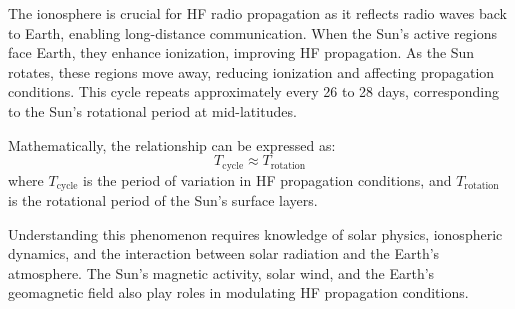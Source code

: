 The ionosphere is crucial for HF radio propagation as it reflects radio waves back to Earth, enabling long-distance communication. When the Sun’s active regions face Earth, they enhance ionization, improving HF propagation. As the Sun rotates, these regions move away, reducing ionization and affecting propagation conditions. This cycle repeats approximately every 26 to 28 days, corresponding to the Sun’s rotational period at mid-latitudes.

Mathematically, the relationship can be expressed as:
\[
T_{\text{cycle}} \approx T_{\text{rotation}}
\]
where \( T_{\text{cycle}} \) is the period of variation in HF propagation conditions, and \( T_{\text{rotation}} \) is the rotational period of the Sun’s surface layers.

Understanding this phenomenon requires knowledge of solar physics, ionospheric dynamics, and the interaction between solar radiation and the Earth’s atmosphere. The Sun’s magnetic activity, solar wind, and the Earth’s geomagnetic field also play roles in modulating HF propagation conditions.

